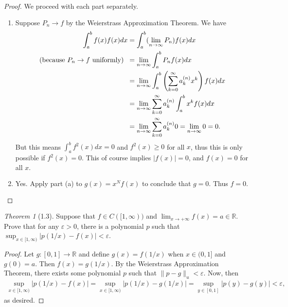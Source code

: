 \documentclass[12pt]{article}
\theoremstyle{remark}
\theoremstyle{named}
\newtheorem*{theorem}{Theorem}
\newcommand{\e}{\varepsilon}
\newcommand{\R}{\mathbb R}
\newcommand{\abs}[1]{|#1|}
\begin{document}
\begin{proof}
    We proceed with each part separately.
    \begin{enumerate}
        \item Suppose \(P_n \to f\) by the Weierstrass Approximation Theorem. We have 
        \begin{align*}
            \int_{a}^{b} f(x) f(x) dx &= \int_{a}^{b} (\lim_{n \to \infty} P_n) f(x) dx \\
            \text{(because \(P_n \to f\) uniformly)} \hspace*{2mm} &= \lim_{n \to \infty} \int_{a}^{b} P_n f(x) dx \\
            &= \lim_{n \to \infty}\int_{a}^{b} \left(\sum_{k = 0}^{\infty} a^{(n)}_k x^k\right) f(x) dx \\
            &= \lim_{n \to \infty} \sum_{k = 0}^{\infty} a^{(n)}_k \int_{a}^{b} x^k f(x) dx \\
            &= \lim_{n \to \infty} \sum_{k = 0}^{\infty} a^{(n)}_k 0 = \lim_{n \to \infty} 0 = 0.
        \end{align*}
        But this means \(\int_{a}^{b} f^2(x) dx = 0\) and \(f^2(x) \geq 0\) for all \(x\), thus this is only possible if \(f^2(x) = 0\). This of course implies \(|f(x)| = 0\), and \(f(x) = 0\) for all \(x\).
        \item Yes. Apply part (a) to \(g(x) = x^N f(x)\) to conclude that \(g = 0\). Thus \(f = 0\).
    \end{enumerate}
\end{proof}

\begin{theorem}[1.3]
    Suppose that \(f \in C([1, \infty))\) and \(\lim_{x \to +\infty} f(x) = a \in \R\). Prove that for any \(\e > 0\), there is a polynomial \(p\) such that \(\sup_{x \in [1, \infty)} \abs{p(1/x) - f(x)} < \e\).
\end{theorem}

\begin{proof}
    Let \(g : [0, 1] \to \R\) and define \(g(x) = f(1/x)\) when \(x \in (0, 1]\) and \(g(0) = a\). Then \(f(x) = g(1/x)\). By the Weierstrass Approximation Theorem, there exists some polynomial \(p\) such that \(\|p - g\|_u < \e\). Now, then
    \begin{align*}
        \sup_{x \in [1, \infty)} \abs{p(1/x) - f(x)} = \sup_{x \in [1, \infty)} \abs{p(1/x) - g(1/x)} = \sup_{y \in [0, 1]} \abs{p(y) - g(y)} < \e,
    \end{align*} 
    as desired.
\end{proof}
\end{document}
